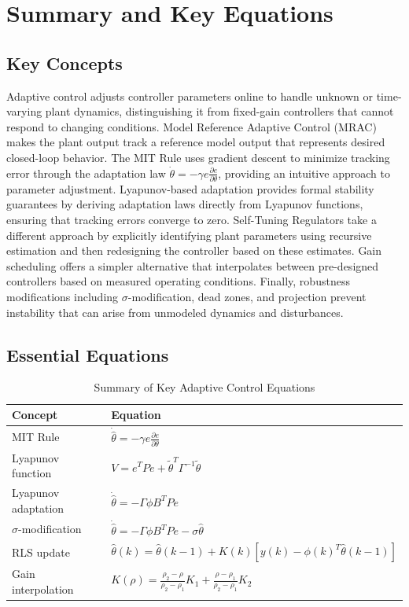 \section{Summary and Key Equations}
\label{sec:adaptive_summary}

\subsection{Key Concepts}

Adaptive control adjusts controller parameters online to handle unknown or time-varying plant dynamics, distinguishing it from fixed-gain controllers that cannot respond to changing conditions. Model Reference Adaptive Control (MRAC) makes the plant output track a reference model output that represents desired closed-loop behavior. The MIT Rule uses gradient descent to minimize tracking error through the adaptation law $\dot{\theta} = -\gamma e \frac{\partial e}{\partial \theta}$, providing an intuitive approach to parameter adjustment. Lyapunov-based adaptation provides formal stability guarantees by deriving adaptation laws directly from Lyapunov functions, ensuring that tracking errors converge to zero. Self-Tuning Regulators take a different approach by explicitly identifying plant parameters using recursive estimation and then redesigning the controller based on these estimates. Gain scheduling offers a simpler alternative that interpolates between pre-designed controllers based on measured operating conditions. Finally, robustness modifications including $\sigma$-modification, dead zones, and projection prevent instability that can arise from unmodeled dynamics and disturbances.

\subsection{Essential Equations}

\begin{table}[H]
\centering
\caption{Summary of Key Adaptive Control Equations}
\begin{tabular}{ll}
\toprule
\textbf{Concept} & \textbf{Equation} \\
\midrule
MIT Rule & $\dot{\hat{\theta}} = -\gamma e \frac{\partial e}{\partial \theta}$ \\[2mm]
Lyapunov function & $V = e^T P e + \tilde{\theta}^T \Gamma^{-1} \tilde{\theta}$ \\[2mm]
Lyapunov adaptation & $\dot{\hat{\theta}} = -\Gamma \phi B^T P e$ \\[2mm]
$\sigma$-modification & $\dot{\hat{\theta}} = -\Gamma \phi B^T P e - \sigma \hat{\theta}$ \\[2mm]
RLS update & $\hat{\theta}(k) = \hat{\theta}(k-1) + K(k)[y(k) - \phi(k)^T\hat{\theta}(k-1)]$ \\[2mm]
Gain interpolation & $K(\rho) = \frac{\rho_2 - \rho}{\rho_2 - \rho_1}K_1 + \frac{\rho - \rho_1}{\rho_2 - \rho_1}K_2$ \\
\bottomrule
\end{tabular}
\end{table}

